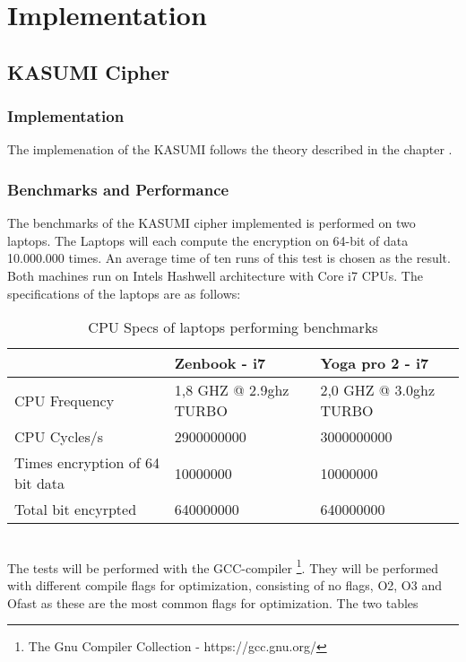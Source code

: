 \chapter{Implementation}
\section{KASUMI Cipher}
\subsection{Implementation}
The implemenation of the KASUMI follows the theory described in the
chapter .


\subsection{Benchmarks and Performance}
The benchmarks of the KASUMI cipher implemented is performed on two
laptops. The Laptops will each compute the encryption on 64-bit of
data 10.000.000 times. An average time of ten runs of this test is
chosen as the result. Both machines run on Intels Hashwell
architecture with Core i7 CPUs. The specifications of the laptops are as follows:
\begin{table}[h!]
    \begin{tabular}{l|l|l}
                                    & Zenbook - i7           & Yoga
                                                               pro 2 -
      i7\\ \hline
    CPU Frequency                   & 1,8 GHZ @ 2.9ghz TURBO & 2,0 GHZ @ 3.0ghz TURBO \\ \hline
    CPU Cycles/s                    & 2900000000             & 3000000000             \\ \hline
    Times encryption of 64 bit data & 10000000               & 10000000               \\ \hline
    Total bit encyrpted             & 640000000              & 640000000              \\
    \end{tabular}
    \caption{CPU Specs of laptops performing benchmarks}
    \label{tab:specs}
\end{table}\\
The tests will be performed with the
GCC-compiler \footnote{The Gnu Compiler Collection -
  https://gcc.gnu.org/}. They will be performed with different compile
flags for optimization, consisting of no flags, O2, O3 and Ofast as
these are the most common flags for optimization. The two tables
